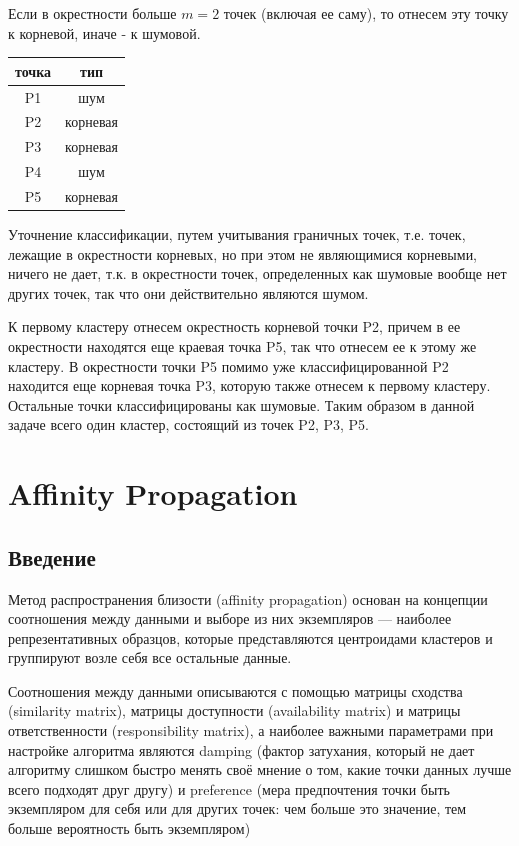 Если в окрестности больше $m=2$ точек (включая ее саму), то отнесем эту точку к корневой, иначе - к шумовой.

\begin{center}
    \begin{tabular}{ |c|c| }
        \hline
        точка & тип      \\\hline
        P1    & шум      \\ 
        P2    & корневая \\ 
        P3    & корневая \\ 
        P4    & шум      \\
        P5    & корневая \\
        \hline
    \end{tabular}
\end{center}

Уточнение классификации, путем учитывания граничных точек, т.е. точек, лежащие в окрестности корневых, но при этом не являющимися корневыми, ничего не дает, т.к. в окрестности точек, определенных как шумовые вообще нет других точек, так что они действительно являются шумом.

К первому кластеру отнесем окрестность корневой точки P2, причем в ее окрестности находятся еще краевая точка P5, так что отнесем ее к этому же кластеру. В окрестности точки P5 помимо уже классифицированной P2 находится еще корневая точка P3, которую также отнесем к первому кластеру. Остальные точки классифицированы как шумовые. Таким образом в данной задаче всего один кластер, состоящий из точек P2, P3, P5.


\section{Affinity Propagation}

\subsection{Введение}

Метод распространения близости (affinity propagation) основан на концепции соотношения между данными и выборе из них экземпляров — наиболее репрезентативных образцов, которые представляются центроидами кластеров и группируют возле себя все остальные данные. 

Соотношения между данными описываются с помощью матрицы сходства (similarity matrix), матрицы доступности (availability matrix) и матрицы ответственности (responsibility matrix), а наиболее важными параметрами при настройке алгоритма являются damping (фактор затухания, который не дает алгоритму слишком быстро менять своё мнение о том, какие точки данных лучше всего подходят друг другу) и preference (мера предпочтения точки быть экземпляром для себя или для других точек: чем больше это значение, тем больше вероятность быть экземпляром)

